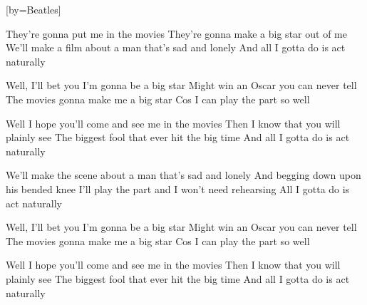  

[by=Beatles]




\beginverse
They're gonna put me in the movies
They're gonna make a big star out of me
We'll make a film about a man that's sad and lonely
And all I gotta do is act naturally
\endverse

\beginverse
Well, I'll bet you I'm gonna be a big star
Might win an Oscar you can never tell
The movies gonna make me a big star
Cos I can play the part so well
\endverse

\beginverse
Well I hope you'll come and see me in the movies
Then I know that you will plainly see
The biggest fool that ever hit the big time
And all I gotta do is act naturally
\endverse

\beginverse
We'll make the scene about a man that's sad and lonely
And begging down upon his bended knee
I'll play the part and I won't need rehearsing
All I gotta do is act naturally
\endverse

\beginverse
Well, I'll bet you I'm gonna be a big star
Might win an Oscar you can never tell
The movies gonna make me a big star
Cos I can play the part so well
\endverse

\beginverse
Well I hope you'll come and see me in the movies
Then I know that you will plainly see
The biggest fool that ever hit the big time
And all I gotta do is act naturally 
\endverse


\endsong
